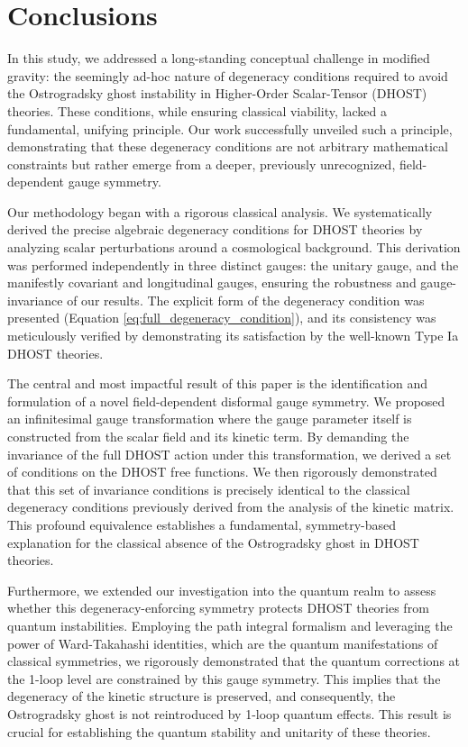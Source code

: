 \documentclass[twocolumn]{aastex631}
\begin{document}
\section{Conclusions}
\label{sec:conclusions}


In this study, we addressed a long-standing conceptual challenge in modified gravity: the seemingly ad-hoc nature of degeneracy conditions required to avoid the Ostrogradsky ghost instability in Higher-Order Scalar-Tensor (DHOST) theories. These conditions, while ensuring classical viability, lacked a fundamental, unifying principle. Our work successfully unveiled such a principle, demonstrating that these degeneracy conditions are not arbitrary mathematical constraints but rather emerge from a deeper, previously unrecognized, field-dependent gauge symmetry.

Our methodology began with a rigorous classical analysis. We systematically derived the precise algebraic degeneracy conditions for DHOST theories by analyzing scalar perturbations around a cosmological background. This derivation was performed independently in three distinct gauges: the unitary gauge, and the manifestly covariant and longitudinal gauges, ensuring the robustness and gauge-invariance of our results. The explicit form of the degeneracy condition was presented (Equation \ref{eq:full_degeneracy_condition}), and its consistency was meticulously verified by demonstrating its satisfaction by the well-known Type Ia DHOST theories.

The central and most impactful result of this paper is the identification and formulation of a novel field-dependent disformal gauge symmetry. We proposed an infinitesimal gauge transformation where the gauge parameter itself is constructed from the scalar field and its kinetic term. By demanding the invariance of the full DHOST action under this transformation, we derived a set of conditions on the DHOST free functions. We then rigorously demonstrated that this set of invariance conditions is precisely identical to the classical degeneracy conditions previously derived from the analysis of the kinetic matrix. This profound equivalence establishes a fundamental, symmetry-based explanation for the classical absence of the Ostrogradsky ghost in DHOST theories.

Furthermore, we extended our investigation into the quantum realm to assess whether this degeneracy-enforcing symmetry protects DHOST theories from quantum instabilities. Employing the path integral formalism and leveraging the power of Ward-Takahashi identities, which are the quantum manifestations of classical symmetries, we rigorously demonstrated that the quantum corrections at the 1-loop level are constrained by this gauge symmetry. This implies that the degeneracy of the kinetic structure is preserved, and consequently, the Ostrogradsky ghost is not reintroduced by 1-loop quantum effects. This result is crucial for establishing the quantum stability and unitarity of these theories.
\end{document}
